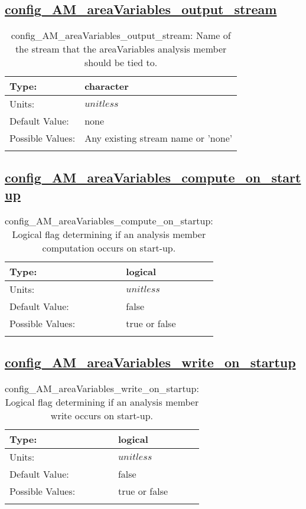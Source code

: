 \subsection[config\_AM\_areaVariables\_output\_stream]{\hyperref[sec:nm_tab_AM_areaVariables]{config\_AM\_areaVariables\_output\_stream}}
\label{subsec:nm_sec_config_AM_areaVariables_output_stream}
\begin{center}
\begin{longtable}{| p{2.0in} || p{4.0in} |}
    \hline
    Type: & character \\
    \hline
    Units: & $unitless$ \\
    \hline
    Default Value: & none \\
    \hline
    Possible Values: & Any existing stream name or 'none' \\
    \hline
    \caption{config\_AM\_areaVariables\_output\_stream: Name of the stream that the areaVariables analysis member should be tied to.}
\end{longtable}
\end{center}
\subsection[config\_AM\_areaVariables\_compute\_on\_startup]{\hyperref[sec:nm_tab_AM_areaVariables]{config\_AM\_areaVariables\_compute\_on\_startup}}
\label{subsec:nm_sec_config_AM_areaVariables_compute_on_startup}
\begin{center}
\begin{longtable}{| p{2.0in} || p{4.0in} |}
    \hline
    Type: & logical \\
    \hline
    Units: & $unitless$ \\
    \hline
    Default Value: & false \\
    \hline
    Possible Values: & true or false \\
    \hline
    \caption{config\_AM\_areaVariables\_compute\_on\_startup: Logical flag determining if an analysis member computation occurs on start-up.}
\end{longtable}
\end{center}
\subsection[config\_AM\_areaVariables\_write\_on\_startup]{\hyperref[sec:nm_tab_AM_areaVariables]{config\_AM\_areaVariables\_write\_on\_startup}}
\label{subsec:nm_sec_config_AM_areaVariables_write_on_startup}
\begin{center}
\begin{longtable}{| p{2.0in} || p{4.0in} |}
    \hline
    Type: & logical \\
    \hline
    Units: & $unitless$ \\
    \hline
    Default Value: & false \\
    \hline
    Possible Values: & true or false \\
    \hline
    \caption{config\_AM\_areaVariables\_write\_on\_startup: Logical flag determining if an analysis member write occurs on start-up.}
\end{longtable}
\end{center}
